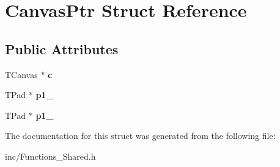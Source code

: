 \hypertarget{structCanvasPtr}{\section{Canvas\-Ptr Struct Reference}
\label{structCanvasPtr}
}
\subsection*{Public Attributes}
\begin{DoxyCompactItemize}
\item 
\hypertarget{structCanvasPtr_a43aa501c472e73caeb5c1c44d141c43a}{T\-Canvas $\ast$ {\bfseries c}}\label{structCanvasPtr_a43aa501c472e73caeb5c1c44d141c43a}

\item 
\hypertarget{structCanvasPtr_a6f9aae5eca044d2c731db354cb38c9c6}{T\-Pad $\ast$ {\bfseries p1\-\_}}\label{structCanvasPtr_a6f9aae5eca044d2c731db354cb38c9c6}

\item 
\hypertarget{structCanvasPtr_a49f2e1a75298107884977f77641e45f8}{T\-Pad $\ast$ {\bfseries p1\-\_}}\label{structCanvasPtr_a49f2e1a75298107884977f77641e45f8}

\end{DoxyCompactItemize}


The documentation for this struct was generated from the following file\-:\begin{DoxyCompactItemize}
\item 
inc/Functions\-\_\-\-Shared.\-h\end{DoxyCompactItemize}
